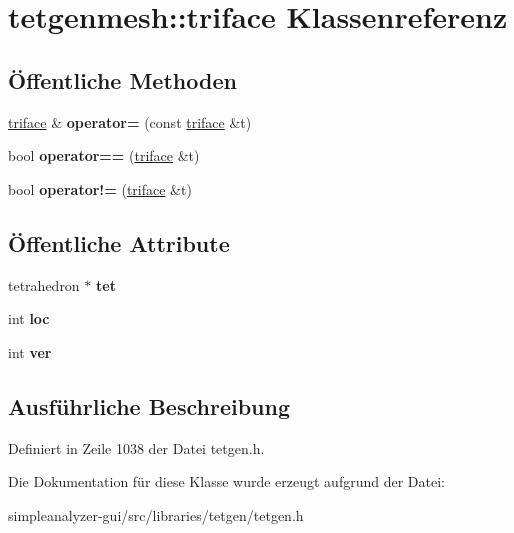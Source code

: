 \hypertarget{classtetgenmesh_1_1triface}{\section{tetgenmesh\-:\-:triface Klassenreferenz}
\label{classtetgenmesh_1_1triface}
}
\subsection*{Öffentliche Methoden}
\begin{DoxyCompactItemize}
\item 
\hypertarget{classtetgenmesh_1_1triface_aeb0b1b77a12ca18599472e01ae8fe119}{\hyperlink{classtetgenmesh_1_1triface}{triface} \& {\bfseries operator=} (const \hyperlink{classtetgenmesh_1_1triface}{triface} \&t)}\label{classtetgenmesh_1_1triface_aeb0b1b77a12ca18599472e01ae8fe119}

\item 
\hypertarget{classtetgenmesh_1_1triface_acab46ae19de31c494a95439b26bcde4e}{bool {\bfseries operator==} (\hyperlink{classtetgenmesh_1_1triface}{triface} \&t)}\label{classtetgenmesh_1_1triface_acab46ae19de31c494a95439b26bcde4e}

\item 
\hypertarget{classtetgenmesh_1_1triface_a03411cf02f8e89d6130035e96d1370d5}{bool {\bfseries operator!=} (\hyperlink{classtetgenmesh_1_1triface}{triface} \&t)}\label{classtetgenmesh_1_1triface_a03411cf02f8e89d6130035e96d1370d5}

\end{DoxyCompactItemize}
\subsection*{Öffentliche Attribute}
\begin{DoxyCompactItemize}
\item 
\hypertarget{classtetgenmesh_1_1triface_ad3b174c4040b18a5286ddfeb8db02529}{tetrahedron $\ast$ {\bfseries tet}}\label{classtetgenmesh_1_1triface_ad3b174c4040b18a5286ddfeb8db02529}

\item 
\hypertarget{classtetgenmesh_1_1triface_a3588d2cb087d2d8448c3482ddc3a2a5b}{int {\bfseries loc}}\label{classtetgenmesh_1_1triface_a3588d2cb087d2d8448c3482ddc3a2a5b}

\item 
\hypertarget{classtetgenmesh_1_1triface_a2b2b1dc34da73125359d6db535d75f7c}{int {\bfseries ver}}\label{classtetgenmesh_1_1triface_a2b2b1dc34da73125359d6db535d75f7c}

\end{DoxyCompactItemize}


\subsection{Ausführliche Beschreibung}


Definiert in Zeile 1038 der Datei tetgen.\-h.



Die Dokumentation für diese Klasse wurde erzeugt aufgrund der Datei\-:\begin{DoxyCompactItemize}
\item 
simpleanalyzer-\/gui/src/libraries/tetgen/tetgen.\-h\end{DoxyCompactItemize}
